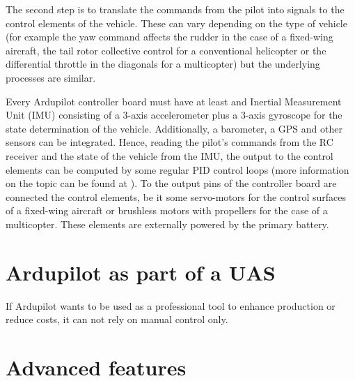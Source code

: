 The second step is to translate the commands from the pilot into signals to the control elements of the vehicle.
These can vary depending on the type of vehicle (for example the yaw command affects the rudder in the case of a fixed-wing aircraft, the tail rotor collective control for a conventional helicopter or the differential throttle in the diagonals for a multicopter) but the underlying processes are similar.

Every Ardupilot controller board must have at least and Inertial Measurement Unit (IMU) consisting of a 3-axis accelerometer plus a 3-axis gyroscope for the state determination of the vehicle.
Additionally, a barometer, a GPS and other sensors can be integrated.
Hence, reading the pilot's commands from the RC receiver and the state of the vehicle from the IMU, the output to the control elements can be computed by some regular PID control loops (more information on the topic can be found at \cite{ogata2010}).
To the output pins of the controller board are connected the control elements, be it some servo-motors for the control surfaces of a fixed-wing aircraft or brushless motors with propellers for the case of a multicopter.
These elements are externally powered by the primary battery.

\section{Ardupilot as part of a UAS}

If Ardupilot wants to be used as a professional tool to enhance production or reduce costs, it can not rely on manual control only. 

\section{Advanced features}


